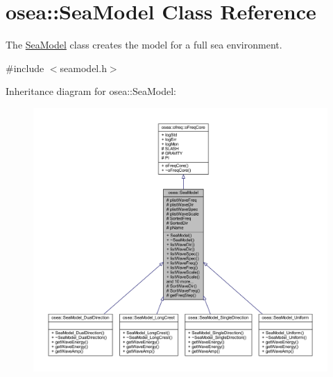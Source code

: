 \hypertarget{classosea_1_1_sea_model}{\section{osea\-:\-:Sea\-Model Class Reference}
\label{classosea_1_1_sea_model}
}


The \hyperlink{classosea_1_1_sea_model}{Sea\-Model} class creates the model for a full sea environment.  




{\ttfamily \#include $<$seamodel.\-h$>$}



Inheritance diagram for osea\-:\-:Sea\-Model\-:
\nopagebreak
\begin{figure}[H]
\begin{center}
\leavevmode
\includegraphics[width=350pt]{classosea_1_1_sea_model__inherit__graph}
\end{center}
\end{figure}

